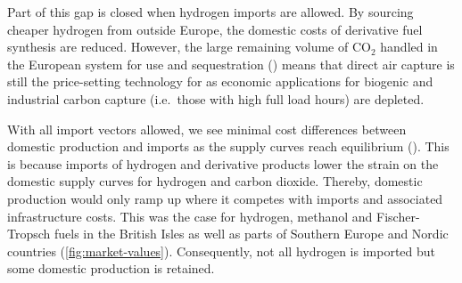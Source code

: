 Part of this gap is closed when hydrogen imports are allowed. By sourcing
cheaper hydrogen from outside Europe, the domestic costs of derivative fuel
synthesis are reduced. However, the large remaining volume of CO$_2$ handled in
the European system for use and sequestration ()
means that direct air capture is still the price-setting technology for 
as economic applications for biogenic and industrial carbon capture (i.e.~those
with high full load hours) are depleted.


With all import vectors allowed, we see minimal cost differences between
domestic production and imports as the supply curves reach equilibrium
(). This is because imports of hydrogen and
derivative products lower the strain on the domestic supply curves for hydrogen
and carbon dioxide. Thereby, domestic production would only ramp up where it
competes with imports and associated infrastructure costs. This was the case for
hydrogen, methanol and Fischer-Tropsch fuels in the British Isles as well as
parts of Southern Europe and Nordic countries (\cref{fig:market-values}).
Consequently, not all hydrogen is imported but some domestic production is
retained.

